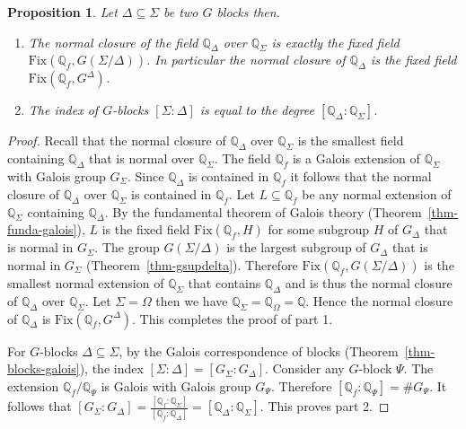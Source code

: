 \documentclass[11pt]{madras}%
\newtheorem{proposition}[theorem]{Proposition}
\theoremstyle{remark}
\newcommand{\Gof}[2][G]{{\ensuremath{#1\left(#2\right)}}}
\newcommand{\Fix}[2]{{\ensuremath{\mathrm{Fix}\left(#1,#2\right)}}}
\begin{document}
\begin{proposition}\label{prop-twoway-galois}%
  Let $\Delta \subseteq \Sigma$ be two $G$ blocks then.
  \begin{enumerate}
  \item The normal closure of the field $\mathbb{Q}_\Delta$ over
    $\mathbb{Q}_\Sigma$ is exactly the fixed field
    $\Fix{\mathbb{Q}_f}{\Gof{\Sigma/\Delta}}$. In particular the
    normal closure of $\mathbb{Q}_\Delta$ is the fixed field
    $\Fix{\mathbb{Q}_f}{G^\Delta}$.
  \item The index of $G$-blocks $[\Sigma : \Delta]$ is equal to the
    degree $[\mathbb{Q}_\Delta : \mathbb{Q}_\Sigma]$.
  \end{enumerate}
\end{proposition}
\begin{proof}
  Recall that the normal closure of $\mathbb{Q}_\Delta$ over
  $\mathbb{Q}_\Sigma$ is the smallest field containing
  $\mathbb{Q}_\Delta$ that is normal over $\mathbb{Q}_\Sigma$.  The
  field $\mathbb{Q}_f$ is a Galois extension of $\mathbb{Q}_\Sigma$
  with Galois group $G_\Sigma$.  Since $\mathbb{Q}_\Delta$ is
  contained in $\mathbb{Q}_f$ it follows that the normal closure of
  $\mathbb{Q}_\Delta$ over $\mathbb{Q}_\Sigma$ is contained in
  $\mathbb{Q}_f$. Let $L \subseteq \mathbb{Q}_f$ be any normal
  extension of $\mathbb{Q}_\Sigma$ containing $\mathbb{Q}_\Delta$.  By
  the fundamental theorem of Galois theory
  (Theorem~\ref{thm-funda-galois}), $L$ is the fixed field
  $\Fix{\mathbb{Q}_f}{H}$ for some subgroup $H$ of $G_\Delta$ that is
  normal in $G_\Sigma$. The group $\Gof{\Sigma/\Delta}$ is the largest
  subgroup of $G_\Delta$ that is normal in $G_\Sigma$
  (Theorem~\ref{thm-gsupdelta}).  Therefore
  $\Fix{\mathbb{Q}_f}{\Gof{\Sigma/\Delta}}$ is the smallest normal
  extension of $\mathbb{Q}_\Sigma$ that contains $\mathbb{Q}_\Delta$
  and is thus the normal closure of $\mathbb{Q}_\Delta$ over
  $\mathbb{Q}_\Sigma$. Let $\Sigma = \Omega$ then we have
  $\mathbb{Q}_\Sigma = \mathbb{Q}_\Omega = \mathbb{Q}$.  Hence the
  normal closure of $\mathbb{Q}_\Delta$ is
  $\Fix{\mathbb{Q}_f}{G^\Delta}$. This completes the proof of part 1.

  For $G$-blocks $\Delta \subseteq \Sigma$, by the Galois
  correspondence of blocks (Theorem~\ref{thm-blocks-galois}), the
  index $[\Sigma: \Delta ] = [G_\Sigma : G_\Delta]$.  Consider any
  $G$-block $\Psi$. The extension $\mathbb{Q}_f/\mathbb{Q}_\Psi$ is
  Galois with Galois group $G_\Psi$.  Therefore $[\mathbb{Q}_f:
  \mathbb{Q}_\Psi] = \# G_\Psi$.  It follows that $[G_\Sigma:
  G_\Delta] = \frac{[\mathbb{Q}_f :
    \mathbb{Q}_\Sigma]}{[\mathbb{Q}_f:\mathbb{Q}_\Delta]} =
  [\mathbb{Q}_\Delta : \mathbb{Q}_\Sigma]$. This proves part 2.
\end{proof}
\end{document}
